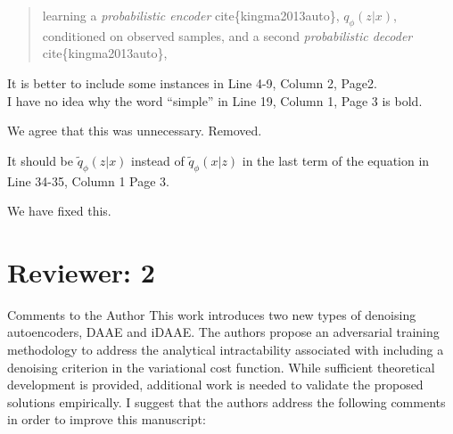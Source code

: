 \documentclass{article}
\begin{document}
\begin{quote}
    learning a \textit{probabilistic encoder} cite\{kingma2013auto\}, $q_\phi(z|x)$, conditioned on observed samples, and a second \textit{probabilistic decoder} cite\{kingma2013auto\},
\end{quote} 

{\color{blue}
It is better to include some instances in Line 4-9, Column 2, Page2.}\\

{\color{blue}
I have no idea why the word “simple” in Line 19, Column 1, Page 3 is bold.}\newline

We agree that this was unnecessary.  Removed.

{\color{blue}
It should be $\tilde q_\phi(z|x)$ instead of $\tilde q_\phi(x|z)$ in the last term of the equation in Line 34-35, Column 1 Page 3. }

We have fixed this.


\section{Reviewer: 2}

Comments to the Author
{\color{blue}
This work introduces two new types of denoising autoencoders, DAAE and iDAAE. The authors propose an adversarial training methodology to address the analytical intractability associated with including a denoising criterion in the variational cost function. While sufficient theoretical development is provided, additional work is needed to validate the proposed solutions empirically. I suggest that the authors address the following comments in order to improve this manuscript:}\newline
\end{document}
